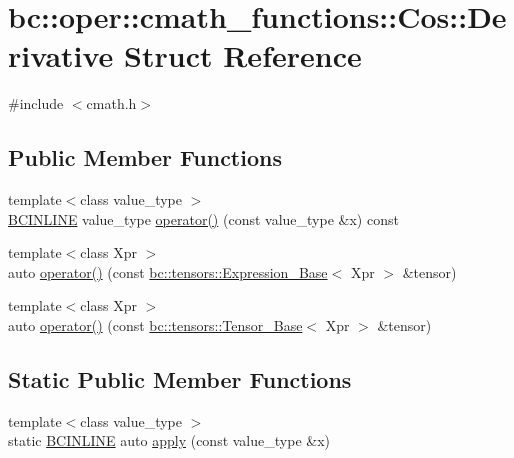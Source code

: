 \hypertarget{structbc_1_1oper_1_1cmath__functions_1_1Cos_1_1Derivative}{}\section{bc\+:\+:oper\+:\+:cmath\+\_\+functions\+:\+:Cos\+:\+:Derivative Struct Reference}
\label{structbc_1_1oper_1_1cmath__functions_1_1Cos_1_1Derivative}


{\ttfamily \#include $<$cmath.\+h$>$}

\subsection*{Public Member Functions}
\begin{DoxyCompactItemize}
\item 
{\footnotesize template$<$class value\+\_\+type $>$ }\\\hyperlink{common_8h_a6699e8b0449da5c0fafb878e59c1d4b1}{B\+C\+I\+N\+L\+I\+NE} value\+\_\+type \hyperlink{structbc_1_1oper_1_1cmath__functions_1_1Cos_1_1Derivative_a50b68714264376c97f257c339c994fbe}{operator()} (const value\+\_\+type \&x) const
\item 
{\footnotesize template$<$class Xpr $>$ }\\auto \hyperlink{structbc_1_1oper_1_1cmath__functions_1_1Cos_1_1Derivative_a5a9d6f6ab7a0dd71443573bbd4f87ba5}{operator()} (const \hyperlink{classbc_1_1tensors_1_1Expression__Base}{bc\+::tensors\+::\+Expression\+\_\+\+Base}$<$ Xpr $>$ \&tensor)
\item 
{\footnotesize template$<$class Xpr $>$ }\\auto \hyperlink{structbc_1_1oper_1_1cmath__functions_1_1Cos_1_1Derivative_ab3e46c7f5e3d790744cd8a6bdb5b5a96}{operator()} (const \hyperlink{classbc_1_1tensors_1_1Tensor__Base}{bc\+::tensors\+::\+Tensor\+\_\+\+Base}$<$ Xpr $>$ \&tensor)
\end{DoxyCompactItemize}
\subsection*{Static Public Member Functions}
\begin{DoxyCompactItemize}
\item 
{\footnotesize template$<$class value\+\_\+type $>$ }\\static \hyperlink{common_8h_a6699e8b0449da5c0fafb878e59c1d4b1}{B\+C\+I\+N\+L\+I\+NE} auto \hyperlink{structbc_1_1oper_1_1cmath__functions_1_1Cos_1_1Derivative_a8a9df4a7a59b72550bed4e23ad91a1a3}{apply} (const value\+\_\+type \&x)
\end{DoxyCompactItemize}


